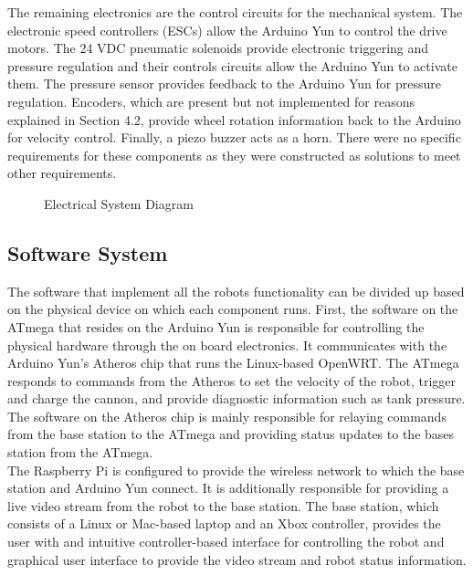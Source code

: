 \documentclass[letterpaper,12pt]{article}
\begin{document}
The remaining electronics are the control circuits for the mechanical system.
The electronic speed controllers (ESCs) allow the Arduino Yun to control the
drive motors. The 24 VDC pneumatic solenoids provide electronic triggering and
pressure regulation and their controls circuits allow the Arduino Yun to
activate them. The pressure sensor provides feedback to the Arduino Yun for
pressure regulation.  Encoders, which are present but not implemented for
reasons explained in Section 4.2, provide wheel rotation information back to
the Arduino for velocity control. Finally, a piezo buzzer acts as a horn. There
were no specific requirements for these components as they were constructed as
solutions to meet other requirements.\\

\begin{figure}[h!]
  \centering
  
  \caption{Electrical System Diagram}
  \label{fig:e_system}
\end{figure}

\subsection{Software System}
The software that implement all the robots functionality can be divided up
based on the physical device on which each component runs. First, the software
on the ATmega that resides on the Arduino Yun is responsible for controlling
the physical hardware through the on board electronics. It communicates with
the Arduino Yun's Atheros chip that runs the Linux-based OpenWRT. The ATmega
responds to commands from the Atheros to set the velocity of the robot, trigger
and charge the cannon, and provide diagnostic information such as tank
pressure. The software on the Atheros chip is mainly responsible for relaying
commands from the base station to the ATmega and providing status updates to
the bases station from the ATmega.\\

The Raspberry Pi is configured to provide the wireless network to which the
base station and Arduino Yun connect. It is additionally responsible for
providing a live video stream from the robot to the base station. The base
station, which consists of a Linux or Mac-based laptop and an Xbox controller,
provides the user with and intuitive controller-based interface for controlling
the robot and graphical user interface to provide the video stream and robot
status information.\\
\end{document}
